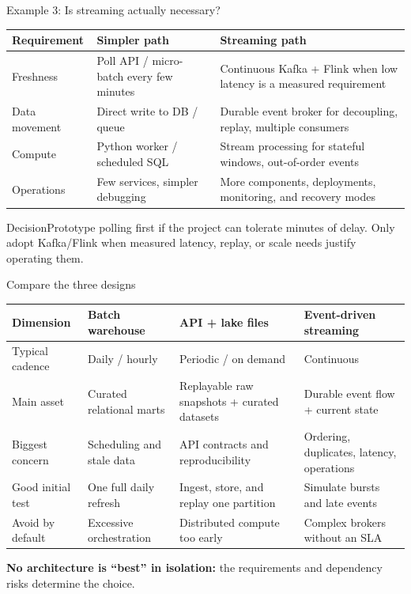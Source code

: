 \documentclass[aspectratio=43,10pt]{beamer}
\begin{document}
\begin{frame}{Example 3: Is streaming actually necessary?}
\small
\begin{tabularx}{\textwidth}{@{}p{2.3cm}p{3.0cm}X@{}}\toprule
Requirement & Simpler path & Streaming path \\ \midrule
Freshness & Poll API / micro-batch every few minutes & Continuous Kafka + Flink when low latency is a measured requirement \\
Data movement & Direct write to DB / queue & Durable event broker for decoupling, replay, multiple consumers \\
Compute & Python worker / scheduled SQL & Stream processing for stateful windows, out-of-order events \\
Operations & Few services, simpler debugging & More components, deployments, monitoring, and recovery modes \\
\bottomrule\end{tabularx}
\vspace{.7em}
\begin{block}{Decision}Prototype polling first if the project can tolerate minutes of delay. Only adopt Kafka/Flink when measured latency, replay, or scale needs justify operating them.\end{block}
\end{frame}

\begin{frame}{Compare the three designs}
\small
\begin{tabularx}{\textwidth}{@{}p{2.55cm}XXX@{}}\toprule
Dimension & Batch warehouse & API + lake files & Event-driven streaming \\ \midrule
Typical cadence & Daily / hourly & Periodic / on demand & Continuous \\
Main asset & Curated relational marts & Replayable raw snapshots + curated datasets & Durable event flow + current state \\
Biggest concern & Scheduling and stale data & API contracts and reproducibility & Ordering, duplicates, latency, operations \\
Good initial test & One full daily refresh & Ingest, store, and replay one partition & Simulate bursts and late events \\
Avoid by default & Excessive orchestration & Distributed compute too early & Complex brokers without an SLA \\
\bottomrule\end{tabularx}
\vspace{.7em}
\par\textbf{No architecture is ``best'' in isolation:} the requirements and dependency risks determine the choice.
\end{frame}
\end{document}
